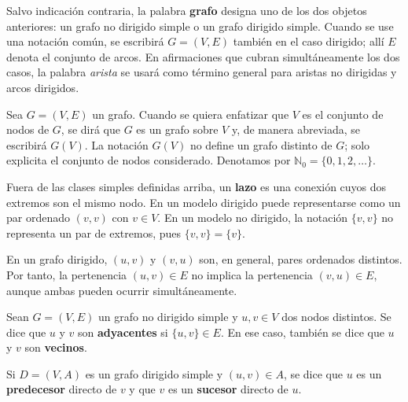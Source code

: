        \begin{observacion}
            Salvo indicación contraria, la palabra \textbf{grafo} designa uno de los dos objetos anteriores: un grafo no dirigido simple o un grafo dirigido simple. Cuando se use una notación común, se escribirá $G=(V,E)$ también en el caso dirigido; allí $E$ denota el conjunto de arcos. En afirmaciones que cubran simultáneamente los dos casos, la palabra \emph{arista} se usará como término general para aristas no dirigidas y arcos dirigidos.
        \end{observacion}

        \begin{observacion}
            Sea $G=(V,E)$ un grafo. Cuando se quiera enfatizar que $V$ es el conjunto de nodos de $G$, se dirá que $G$ es un grafo sobre $V$ y, de manera abreviada, se escribirá $G(V)$. La notación $G(V)$ no define un grafo distinto de $G$; solo explicita el conjunto de nodos considerado.
            Denotamos por $\mathbb{N}_0=\{0,1,2,\dots\}$.
        \end{observacion}

        \begin{definicion}[Lazo]
            Fuera de las clases simples definidas arriba, un \textbf{lazo} es una conexión cuyos dos extremos son el mismo nodo. En un modelo dirigido puede representarse como un par ordenado $(v,v)$ con $v\in V$. En un modelo no dirigido, la notación $\{v,v\}$ no representa un par de extremos, pues $\{v,v\}=\{v\}$.
        \end{definicion}

        \begin{observacion}
            En un grafo dirigido, $(u,v)$ y $(v,u)$ son, en general, pares ordenados distintos. Por tanto, la pertenencia $(u,v)\in E$ no implica la pertenencia $(v,u)\in E$, aunque ambas pueden ocurrir simultáneamente.
        \end{observacion}

        \begin{definicion}
            Sean $G=(V,E)$ un grafo no dirigido simple y $u,v\in V$ dos nodos distintos.
            Se dice que $u$ y $v$ son \textbf{adyacentes} si $\{u,v\}\in E$. En ese caso, también se dice que $u$ y $v$ son \textbf{vecinos}.

            Si $D=(V,A)$ es un grafo dirigido simple y $(u,v)\in A$, se dice que $u$ es un \textbf{predecesor} directo de $v$ y que $v$ es un \textbf{sucesor} directo de $u$.
        \end{definicion}

